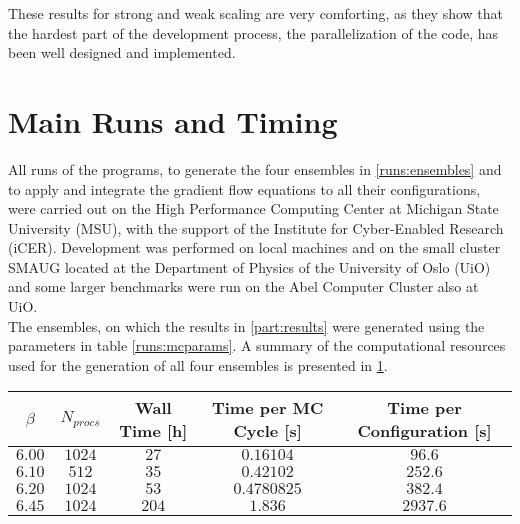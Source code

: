 These results for strong and weak scaling are very comforting, as they show that the hardest part of the development process, the parallelization of the code, has been well designed and implemented.


\section{Main Runs and Timing}
All runs of the programs, to generate the four ensembles in \cref{runs:ensembles} and to apply and integrate the gradient flow equations to all their configurations, were carried out on the High Performance Computing Center at Michigan State University (MSU), with the support of the Institute for Cyber-Enabled Research (iCER). Development was performed on local machines and on the small cluster SMAUG located at the Department of Physics of the University of Oslo (UiO) and some larger benchmarks were run on the Abel Computer Cluster also at UiO.\\
The ensembles, on which the results in \cref{part:results} were generated using the parameters in table \cref{runs:mcparams}. A summary of the computational resources used for the generation of all four ensembles is presented in \cref{runs:times}. 

\begin{table}[!htb]
    \begin{center}
    \begin{tabular}{ccccc}
        $\beta$ & $N_{procs}$ & Wall Time [h] & Time per MC Cycle [s] & Time per Configuration [s]\\\hline
        $6.00$ & $1024$ & $27$ & $0.16104$  & $96.6$\\
        $6.10$ & $512$ & $35$ & $0.42102$ & $252.6$\\
        $6.20$ & $1024$ & $53$ & $0.4780825$ & $382.4$ \\
        $6.45$ & $1024$ & $204$ & $1.836$ & $2937.6$
    \end{tabular}
    \label{runs:times} 
    \end{center}
\end{table}

